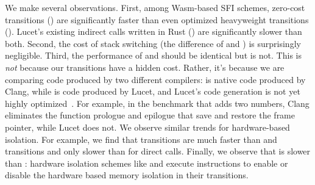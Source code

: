 We make several observations.
%
First, among Wasm-based SFI schemes, zero-cost transitions (\trfast) are
significantly faster than even optimized heavyweight transitions
(\trfullswitch).
%
Lucet's existing indirect calls written in Rust (\trlucet) are significantly
slower than both.
%
Second, the cost of stack switching (the difference of \trfullswitch and
\trregsave) is surprisingly negligible.
%
Third, the performance of \trnative and \trfast should be identical but is not.
%
This is \emph{not} because our transitions have a hidden cost. Rather, it's
because we are comparing code produced by two different compilers:
\trnative is native code produced by Clang,  while \trfast is code produced by
Lucet, and Lucet's code generation is not yet highly
optimized~\cite{cranelift-speedup}.
%
For example, in the benchmark that adds two numbers, Clang eliminates
the function prologue and epilogue that save and restore the frame
pointer, while Lucet does not.
%
%
We observe similar trends for hardware-based isolation.
%
For example, we find that \trsegmentsfi transitions are much faster than
\tridealheavy and \trnacl transitions and only \tranSegzeroNativeFuncDiff
slower than \trnative for direct calls.
%
Finally, we observe that \trsegmentsfi is slower than \trfast: hardware
isolation schemes like \trsegmentsfi and \trnacl execute instructions to enable
or disable the hardware based memory isolation in their transitions.
